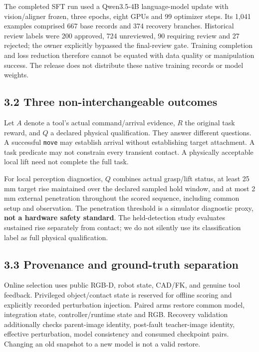 \documentclass[10pt]{article}
\begin{document}
The completed SFT run used a Qwen3.5-4B language-model update with vision/aligner frozen, three epochs, eight GPUs and 99 optimizer steps. Its 1,041 examples comprised 667 base records and 374 recovery branches. Historical review labels were 200 approved, 724 unreviewed, 90 requiring review and 27 rejected; the owner explicitly bypassed the final-review gate. Training completion and loss reduction therefore cannot be equated with data quality or manipulation success. The release does not distribute these native training records or model weights.

\subsection*{3.2 Three non-interchangeable outcomes}

Let \(A\) denote a tool's actual command/arrival evidence, \(R\) the original task reward, and \(Q\) a declared physical qualification. They answer different questions. A successful \texttt{move} may establish arrival without establishing target attachment. A task predicate may not constrain every transient contact. A physically acceptable local lift need not complete the full task.

For local perception diagnostics, \(Q\) combines actual grasp/lift status, at least 25 mm target rise maintained over the declared sampled hold window, and at most 2 mm external penetration throughout the scored sequence, including common setup and observation. The penetration threshold is a simulator diagnostic proxy, \textbf{not a hardware safety standard}. The held-detection study evaluates sustained rise separately from contact; we do not silently use its classification label as full physical qualification.

\subsection*{3.3 Provenance and ground-truth separation}

Online selection uses public RGB-D, robot state, CAD/FK, and genuine tool feedback. Privileged object/contact state is reserved for offline scoring and explicitly recorded perturbation injection. Paired arms restore common model, integration state, controller/runtime state and RGB. Recovery validation additionally checks parent-image identity, post-fault teacher-image identity, effective perturbation, model consistency and consumed checkpoint pairs. Changing an old snapshot to a new model is not a valid restore.
\end{document}

